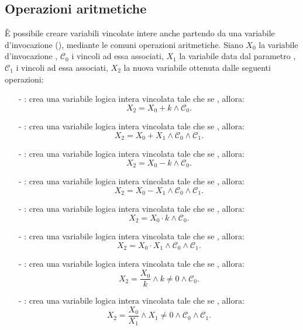 \subsection{Operazioni aritmetiche}
\`E possibile creare variabili vincolate intere anche partendo da una
variabile d'invocazione (), mediante le comuni operazioni
aritmetiche. Siano $X_0$ la variabile d'invocazione , $\mathcal{C}_0$ 
i vincoli ad essa associati, $X_1$ la variabile data dal parametro , 
$\mathcal{C}_1$ i vincoli ad essa associati, $X_2$ la nuova variabile 
ottenuta dalle seguenti operazioni:
\begin{itemize}
\item[-]: crea una variabile logica intera 
vincolata  tale che se , allora:
\[
X_2 = X_0 + k \wedge \mathcal{C}_0.
\]
\item[-]: crea una variabile logica intera 
vincolata tale che se , allora:
\[
X_2 = X_0 + X_1 \wedge \mathcal{C}_0 \wedge \mathcal{C}_1.
\]
\item[-]: crea una variabile logica intera 
vincolata tale che se , allora:
\[
X_2 = X_0 - k \wedge \mathcal{C}_0.
\]
\item[-]: crea una variabile logica intera 
vincolata tale che se , allora:
\[
X_2 = X_0 - X_1 \wedge \mathcal{C}_0 \wedge \mathcal{C}_1.
\]
\item[-]: crea una variabile logica intera 
vincolata tale che se , allora:
\[
X_2 = X_0 \cdot k \wedge \mathcal{C}_0.
\]
\item[-]:  crea una variabile logica intera 
vincolata tale che se , allora:
\[
X_2 = X_0 \cdot X_1 \wedge \mathcal{C}_0 \wedge \mathcal{C}_1.
\] 
\item[-]: crea una variabile logica intera 
vincolata tale che se , allora:
\[
X_2 = \frac{X_0}{k} \wedge k \neq 0 \wedge \mathcal{C}_0.
\]
\item[-]:  crea una variabile logica intera 
vincolata tale che se , allora:
\[
X_2 = \frac{X_0}{X_1} \wedge X_1 \neq 0 \wedge \mathcal{C}_0 \wedge 
\mathcal{C}_1.
\]
\end{itemize}

